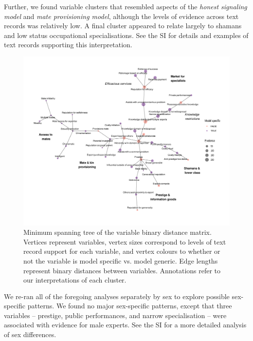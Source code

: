 \documentclass[
  11pt,
]{article}
\begin{document}
Further, we found variable clusters that resembled aspects of the \emph{honest signaling model} and \emph{mate provisioning model}, although the levels of evidence across text records was relatively low. A final cluster appeared to relate largely to shamans and low status occupational specialisations. See the SI for details and examples of text records supporting this interpretation.

\begin{landscape}

\begin{figure}

{\centering \includegraphics{conceptual-experts-paper_files/figure-latex/minspantree-1} 

}

\caption{Minimum spanning tree of the variable binary distance matrix. Vertices represent variables, vertex sizes correspond to levels of text record support for each variable, and vertex colours to whether or not the variable is model specific vs. model generic. Edge lengths represent binary distances between variables. Annotations refer to our interpretations of each cluster.}\label{fig:minspantree}
\end{figure}

\end{landscape}

We re-ran all of the foregoing analyses separately by sex to explore possible sex-specific patterns. We found no major sex-specific patterns, except that three variables -- prestige, public performances, and narrow specialisation -- were associated with evidence for male experts. See the SI for a more detailed analysis of sex differences.
\end{document}
